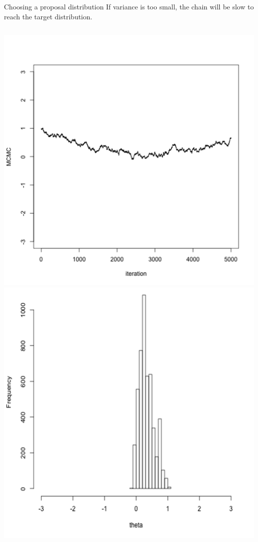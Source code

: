 \documentclass[compress]{beamer}
\begin{document}
\begin{frame}[label=sec-8-3]{Choosing a proposal distribution}
If \alert {variance is too small}, the chain will be slow to reach the target distribution.
\begin{columns}[c] 
\includegraphics[width=0.8\linewidth]{Var1}
\includegraphics[width=0.8\linewidth]{Trace1}
\end{columns}  
\end{frame}
\end{document}
